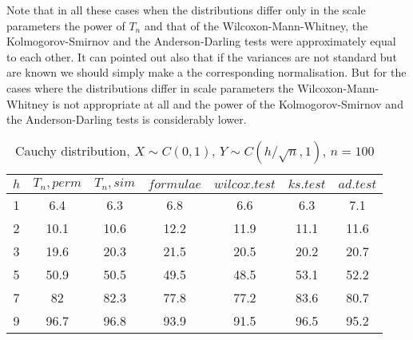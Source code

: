 \documentclass{svproc}
\begin{document}
Note that in all these cases when the distributions differ only in the scale parameters the power of  $T_n$ and  that of the Wilcoxon-Mann-Whitney, the
Kol\-mogorov-Smirnov and the Anderson-Darling tests were approximately equal to each other.
It can pointed out also that if the variances are not standard  but are known we should simply make a the corresponding normalisation.
But for the cases where the distributions differ in scale parameters the Wilcoxon-Mann-Whitney is not appropriate at all and the power of  the Kolmogorov-Smirnov and the Anderson-Darling tests is considerably lower.


\begin{table}
  \caption{Cauchy distribution, $X\sim C(0,1)$, $Y\sim C(h/\sqrt{n},1)$, $n=100$}
  \begin{center}
  \begin{tabular}{c@{\quad}c@{\quad}c@{\quad}c@{\quad}c@{\quad}c@{\quad}c}
  \hline
  $h$ & $T_n, perm$ & $T_n, sim$ & $formulae$ & $wilcox.test$ & $ks.test$ & $ad.test$ \\
  \hline
  1 & 6.4 & 6.3 & 6.8 & 6.6 & 6.3 & 7.1\\
  2 & 10.1 & 10.6 & 12.2 & 11.9 & 11.1 & 11.6 \\
  3 & 19.6 & 20.3 & 21.5 & 20.5 & 20.2 & 20.7 \\
  5 & 50.9 & 50.5 & 49.5 & 48.5 & 53.1 & 52.2 \\
  7 & 82 & 82.3 & 77.8 & 77.2 & 83.6 & 80.7 \\
  9 & 96.7 & 96.8 & 93.9 & 91.5 & 96.5 & 95.2 \\
  \hline
  \end{tabular}
  \end{center}
\end{table}
\end{document}
